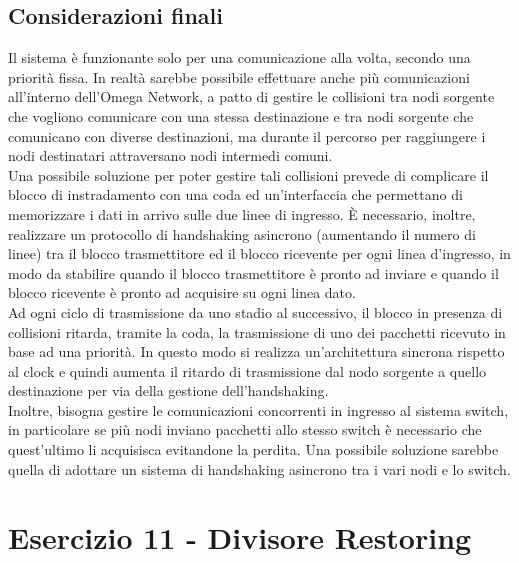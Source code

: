 \documentclass[12pt]{article}
\begin{document}
\subsection{Considerazioni finali}
Il sistema è funzionante solo per una comunicazione alla volta, secondo una priorità fissa. In realtà sarebbe possibile effettuare anche più comunicazioni all’interno dell’Omega Network, a patto di gestire le collisioni tra nodi sorgente che vogliono comunicare con una stessa destinazione e tra nodi sorgente che comunicano con diverse destinazioni, ma durante il percorso per raggiungere i nodi destinatari attraversano nodi intermedi comuni.
\\Una possibile soluzione per poter gestire tali collisioni prevede di complicare il blocco di instradamento con una coda ed un’interfaccia che permettano di memorizzare i dati in arrivo sulle due linee di ingresso. È necessario, inoltre, realizzare un protocollo di handshaking asincrono (aumentando il numero di linee) tra il blocco trasmettitore ed il blocco ricevente per ogni linea d’ingresso, in modo da stabilire quando il blocco trasmettitore è pronto ad inviare e quando il blocco ricevente è pronto ad acquisire su ogni linea dato.
\\Ad ogni ciclo di trasmissione da uno stadio al successivo, il blocco in presenza di collisioni ritarda, tramite la coda, la trasmissione di uno dei pacchetti ricevuto in base ad una priorità. In questo modo si realizza un’architettura sincrona rispetto al clock e quindi aumenta il ritardo di trasmissione dal nodo sorgente a quello destinazione per via della gestione dell’handshaking.
\\Inoltre, bisogna gestire le comunicazioni concorrenti in ingresso al sistema switch, in particolare se più nodi inviano pacchetti allo stesso switch è necessario che quest’ultimo li acquisisca evitandone la perdita. Una possibile soluzione sarebbe quella di adottare un sistema di handshaking asincrono tra i vari nodi e lo switch.

\newpage
\section{Esercizio 11 - Divisore Restoring}
\end{document}
